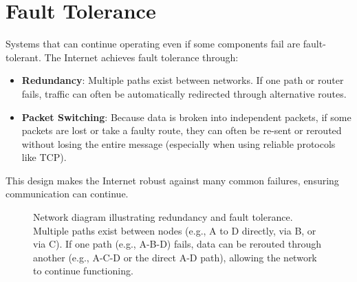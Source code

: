 \documentclass[11pt,oneside]{book}
\begin{document}
\section{Fault Tolerance}
\label{sec:fault_tolerance}
Systems that can continue operating even if some components fail are fault-tolerant. The Internet achieves fault tolerance through:
\begin{itemize}
    \item \textbf{Redundancy}: Multiple paths exist between networks. If one path or router fails, traffic can often be automatically redirected through alternative routes.
    \item \textbf{Packet Switching}: Because data is broken into independent packets, if some packets are lost or take a faulty route, they can often be re-sent or rerouted without losing the entire message (especially when using reliable protocols like TCP).
\end{itemize}
This design makes the Internet robust against many common failures, ensuring communication can continue.

\begin{figure}[h!]
    \centering
    \captionsetup{list=no} %
    \caption{
        Network diagram illustrating redundancy and fault tolerance. Multiple paths exist between nodes (e.g., A to D directly, via B, or via C). If one path (e.g., A-B-D) fails, data can be rerouted through another (e.g., A-C-D or the direct A-D path), allowing the network to continue functioning.
    }
    \label{fig:network-redundancy}
\end{figure}
\end{document}
